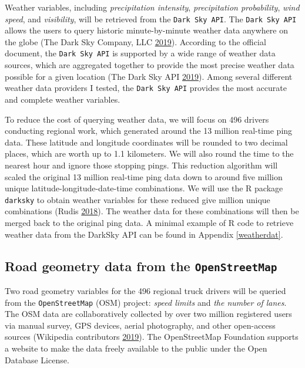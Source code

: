 \documentclass[12pt]{book}
\numberwithin{equation}{chapter}
\begin{document}
Weather variables, including \emph{precipitation intensity}, \emph{precipitation probability}, \emph{wind speed}, and \emph{visibility}, will be retrieved from the \texttt{Dark\ Sky\ API}.
The \texttt{Dark\ Sky\ API} allows the users to query historic minute-by-minute weather data anywhere on the globe (The Dark Sky Company, LLC \protect\hyperlink{ref-darksky}{2019}).
According to the official document, the \texttt{Dark\ Sky\ API} is supported by a wide range of weather data sources, which are aggregated together to provide the most precise weather data possible for a given location (The Dark Sky API \protect\hyperlink{ref-darkskyds}{2019}).
Among several different weather data providers I tested, the \texttt{Dark\ Sky\ API} provides the most accurate and complete weather variables.

To reduce the cost of querying weather data, we will focus on 496 drivers conducting regional work, which generated around the 13 million real-time ping data. These latitude and longitude coordinates will be rounded to two decimal places, which are worth up to 1.1 kilometers.
We will also round the time to the nearest hour and ignore those stopping pings.
This reduction algorithm will scaled the original 13 million real-time ping data down to around five million unique latitude-longitude-date-time combinations.
We will use the R package \texttt{darksky} to obtain weather variables for these reduced give million unique combinations (Rudis \protect\hyperlink{ref-hrbrmstr}{2018}).
The weather data for these combinations will then be merged back to the original ping data.
A minimal example of R code to retrieve weather data from the DarkSky API can be found in Appendix \ref{weatherdat}.

\hypertarget{road-geometry-data-from-the-openstreetmap}{%
\subsection{\texorpdfstring{Road geometry data from the \texttt{OpenStreetMap}}{Road geometry data from the OpenStreetMap}}\label{road-geometry-data-from-the-openstreetmap}}

Two road geometry variables for the 496 regional truck drivers will be queried from the \texttt{OpenStreetMap} (OSM) project: \emph{speed limits} and \emph{the number of lanes}.
The OSM data are collaboratively collected by over two million registered users via manual survey, GPS devices, aerial photography, and other open-access sources (Wikipedia contributors \protect\hyperlink{ref-wikiOSM}{2019}).
The OpenStreetMap Foundation supports a website to make the data freely available to the public under the Open Database License.
\end{document}
